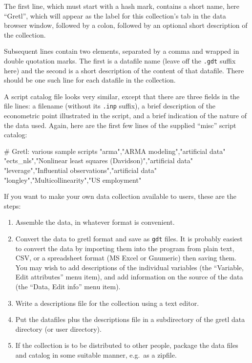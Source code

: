 The first line, which must start with a hash mark, contains a short
name, here ``Gretl'', which will appear as the label for this
collection's tab in the data browser window, followed by a colon,
followed by an optional short description of the collection.

Subsequent lines contain two elements, separated by a comma and
wrapped in double quotation marks.  The first is a datafile name
(leave off the \verb+.gdt+ suffix here) and the second is a short
description of the content of that datafile.  There should be one such
line for each datafile in the collection.

A script catalog file looks very similar, except that there are three
fields in the file lines: a filename (without its \verb+.inp+ suffix),
a brief description of the econometric point illustrated in the
script, and a brief indication of the nature of the data used.  Again,
here are the first few lines of the supplied ``misc'' script catalog:

\begin{code}
# Gretl: various sample scripts
"arma","ARMA modeling","artificial data"
"ects_nls","Nonlinear least squares (Davidson)","artificial data"
"leverage","Influential observations","artificial data"
"longley","Multicollinearity","US employment"
\end{code}

If you want to make your own data collection available to users, these
are the steps:

\begin{enumerate}
\item Assemble the data, in whatever format is convenient.
\item Convert the data to gretl format and save as \verb+gdt+
  files.  It is probably easiest to convert the data by importing them
  into the program from plain text, CSV, or a spreadsheet format (MS
  Excel or Gnumeric) then saving them. You may wish to add
  descriptions of the individual variables (the ``Variable, Edit
  attributes'' menu item), and add information on the source of the
  data (the ``Data, Edit info'' menu item).
\item Write a descriptions file for the collection using a text
  editor.
\item Put the datafiles plus the descriptions file in a subdirectory
  of the gretl data directory (or user directory).
\item If the collection is to be distributed to other people, package
  the data files and catalog in some suitable manner, e.g.\ as a
  zipfile.
\end{enumerate}

